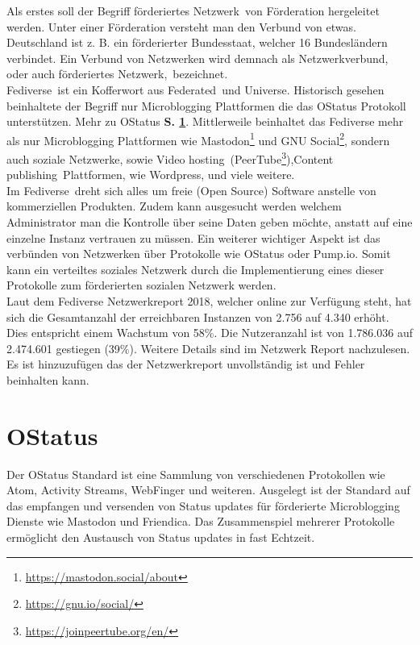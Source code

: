 Als erstes soll der Begriff \glqq förderiertes Netzwerk\grqq~von Förderation hergeleitet werden. Unter einer Förderation versteht man den Verbund von etwas. Deutschland ist z. B. ein förderierter Bundesstaat, welcher 16 Bundesländern verbindet. Ein Verbund von Netzwerken wird demnach als Netzwerkverbund, oder auch \glqq förderiertes Netzwerk\grqq,~bezeichnet.\\

\glqq Fediverse\grqq~ist ein Kofferwort aus \glqq Federated\grqq~und \glqq Universe\grqq. Historisch gesehen beinhaltete der Begriff nur Microblogging Plattformen die das OStatus Protokoll unterstützen. Mehr zu OStatus \textbf{S. \ref{sub:ostatus}}. Mittlerweile beinhaltet das Fediverse mehr als nur Microblogging Plattformen wie Mastodon\footnote{\url{https://mastodon.social/about}} und GNU Social\footnote{\url{https://gnu.io/social/}}, sondern auch soziale Netzwerke, sowie \glqq Video hosting\grqq~(PeerTube\footnote{\url{https://joinpeertube.org/en/}}),\glqq Content publishing\grqq~Plattformen, wie Wordpress, und viele weitere.\cite{fediverse}\\

Im \glqq Fediverse\grqq~dreht sich alles um freie (Open Source) Software anstelle von kommerziellen Produkten. Zudem kann ausgesucht werden welchem Administrator man die Kontrolle über seine Daten geben möchte, anstatt auf eine einzelne Instanz vertrauen zu müssen.\cite{fediverse} Ein weiterer wichtiger Aspekt ist das verbünden von Netzwerken über Protokolle wie OStatus oder Pump.io. Somit kann ein verteiltes soziales Netzwerk durch die Implementierung eines dieser Protokolle zum förderierten sozialen Netzwerk werden.\\

Laut dem Fediverse Netzwerkreport 2018, welcher online zur Verfügung steht, hat sich die Gesamtanzahl der erreichbaren Instanzen von 2.756 auf 4.340 erhöht. Dies entspricht einem Wachstum von 58\%. Die Nutzeranzahl ist von 1.786.036 auf 2.474.601 gestiegen (39\%). Weitere Details sind im Netzwerk Report nachzulesen. Es ist hinzuzufügen das der Netzwerkreport unvollständig ist und Fehler beinhalten kann.\cite{fediverse-report}\\	
\section{OStatus}
\label{sub:ostatus}
Der OStatus Standard ist eine Sammlung von verschiedenen Protokollen wie Atom, Activity Streams, WebFinger und weiteren. Ausgelegt ist der Standard auf das empfangen und versenden von Status updates für förderierte Microblogging Dienste wie Mastodon und Friendica. Das Zusammenspiel mehrerer Protokolle ermöglicht den Austausch von Status updates in fast Echtzeit.~\\
